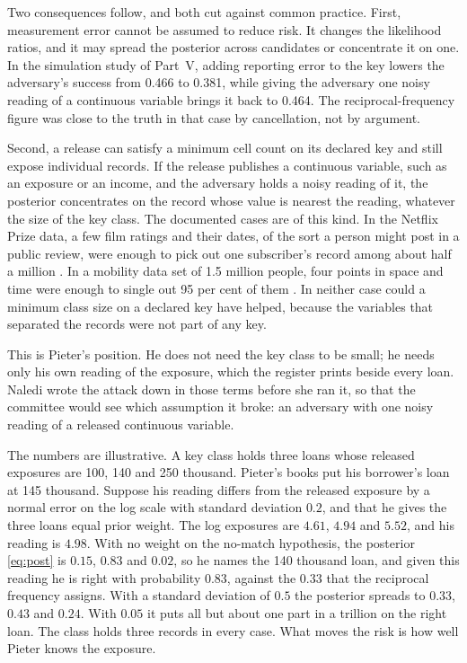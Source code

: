 Two consequences follow, and both cut against common practice. First, measurement
error cannot be assumed to reduce risk. It changes the likelihood ratios, and it
may spread the posterior across candidates or concentrate it on one. In the
simulation study of Part~V, adding reporting error to the key lowers the
adversary's success from 0.466 to 0.381, while giving the adversary one noisy
reading of a continuous variable brings it back to 0.464. The reciprocal-frequency
figure was close to the truth in that case by cancellation, not by argument.

Second, a release can satisfy a minimum cell count on its declared key and still
expose individual records. If the release publishes a continuous variable, such as
an exposure or an income, and the adversary holds a noisy reading of it, the
posterior concentrates on the record whose value is nearest the reading, whatever
the size of the key class. The documented cases are of this kind. In the Netflix Prize data, a few film ratings and their dates, of the sort a person might post in a public review, were enough to pick out one subscriber's record among about half a million \citep{narayanan2008}. In a mobility data set of 1.5 million people, four points in space and time were enough to single out 95 per cent of them \citep{demontjoye2013}. In neither case could a minimum class size on a declared key have helped, because the variables that separated the records were not part of any key.

This is Pieter's position. He does not need the key class to be small; he needs only his own reading of the exposure, which the register prints beside every loan. Naledi wrote the attack down in those terms before she ran it, so that the committee would see which assumption it broke: an adversary with one noisy reading of a released continuous variable.

\begin{example}\label{c2:ex-pieter}
The numbers are illustrative. A key class holds three loans whose released exposures are 100, 140 and 250 thousand. Pieter's books put his borrower's loan at 145 thousand. Suppose his reading differs from the released exposure by a normal error on the log scale with standard deviation $0.2$, and that he gives the three loans equal prior weight. The log exposures are $4.61$, $4.94$ and $5.52$, and his reading is $4.98$. With no weight on the no-match hypothesis, the posterior \eqref{eq:post} is $0.15$, $0.83$ and $0.02$, so he names the 140 thousand loan, and given this reading he is right with probability $0.83$, against the $0.33$ that the reciprocal frequency assigns. With a standard deviation of $0.5$ the posterior spreads to $0.33$, $0.43$ and $0.24$. With $0.05$ it puts all but about one part in a trillion on the right loan. The class holds three records in every case. What moves the risk is how well Pieter knows the exposure.
\end{example}

